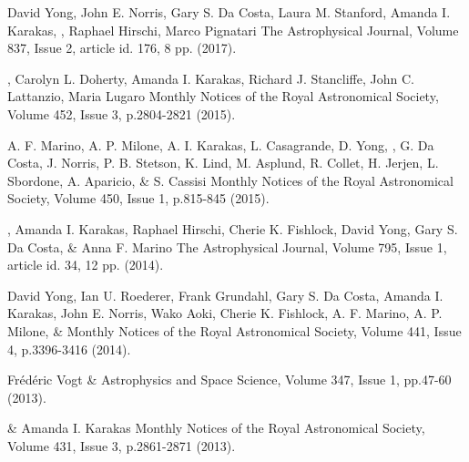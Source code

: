 {David Yong, John E. Norris, Gary S. Da Costa, Laura M. Stanford, Amanda I. Karakas, , Raphael Hirschi, Marco Pignatari}
{The Astrophysical Journal, Volume 837, Issue 2, article id. 176, 8 pp. (2017).}

{, Carolyn L. Doherty, Amanda I. Karakas, Richard J. Stancliffe, John C. Lattanzio, Maria Lugaro}
{Monthly Notices of the Royal Astronomical Society, Volume 452, Issue 3, p.2804-2821 (2015).}

{A. F. Marino, A. P. Milone, A. I. Karakas, L. Casagrande, D. Yong, , G. Da Costa, J. Norris, P. B. Stetson,  K. Lind, M. Asplund, R. Collet, H. Jerjen, L. Sbordone, A. Aparicio, \& S. Cassisi}
{Monthly Notices of the Royal Astronomical Society, Volume 450, Issue 1, p.815-845 (2015).}

{, Amanda I. Karakas, Raphael Hirschi, Cherie K. Fishlock, David Yong, Gary S. Da Costa, \& Anna F. Marino}
{The Astrophysical Journal, Volume 795, Issue 1, article id. 34, 12 pp. (2014).}

{David Yong, Ian U. Roederer, Frank Grundahl, Gary S. Da Costa, Amanda I. Karakas, John E. Norris, Wako Aoki, Cherie K. Fishlock, A. F. Marino, A. P. Milone, \& }
{Monthly Notices of the Royal Astronomical Society, Volume 441, Issue 4, p.3396-3416 (2014).}

{Fr\'{e}d\'{e}ric Vogt \& }
{Astrophysics and Space Science, Volume 347, Issue 1, pp.47-60 (2013).}

{ \& Amanda I. Karakas}
{Monthly Notices of the Royal Astronomical Society, Volume 431, Issue 3, p.2861-2871 (2013).}

